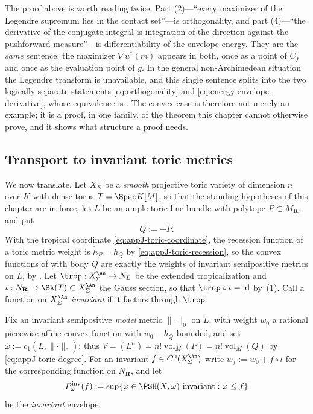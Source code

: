 \begin{remark}
\label{rem:ch27-one-computation}
The proof above is worth reading twice.  Part (2)---``every maximizer of the
Legendre supremum lies in the contact set''---is orthogonality, and part
(4)---``the derivative of the conjugate integral is integration of the
direction against the pushforward measure''---is differentiability of the
envelope energy.  They are the \emph{same} sentence: the maximizer
$\nabla u^*(m)$ appears in both, once as a point of $C_f$ and once as the
evaluation point of $g$.  In the general non-Archimedean situation the
Legendre transform is unavailable, and this single sentence splits into the
two logically separate statements \eqref{eq:orthogonality} and
\eqref{eq:energy-envelope-derivative}, whose equivalence is
.  The convex case is
therefore not merely an example; it is a proof, in one family, of the
theorem this chapter cannot otherwise prove, and it shows what structure a
proof needs.
\end{remark}

\subsection{Transport to invariant toric metrics}
\label{sec:ch27-toric-transport}

We now translate.  Let $X_\Sigma$ be a \emph{smooth} projective toric
variety of dimension $n$ over $K$ with dense torus $T=\Spec K[M]$, so
that the standing hypotheses of this chapter are in force, let $L$ be an
ample toric line bundle with polytope $P\subset M_{\mathbf R}$, and put
\[
 Q:=-P .
\]
With the tropical coordinate \eqref{eq:appJ-toric-coordinate}, the recession
function of a toric metric weight is
$\check h_P=h_Q$ by \eqref{eq:appJ-toric-recession}, so the convex
functions of  with body $Q$ are
exactly the weights of invariant semipositive metrics on $L$, by
.  Let $\trop:X_\Sigma^{\An}\to
N_\Sigma$ be the extended tropicalization and
$\iota:N_{\mathbf R}\to\Sk(T)\subset X_\Sigma^{\An}$ the Gauss section, so
that $\trop\circ\iota=\operatorname{id}$ by
\,(1).  Call a function on $X_\Sigma^{\An}$
\emph{invariant} if it factors through $\trop$.

Fix an invariant semipositive \emph{model} metric $\lVert\cdot\rVert_0$ on
$L$, with weight $w_0$ a rational piecewise affine convex function with
$w_0-h_Q$ bounded, and set $\omega:=c_1(L,\lVert\cdot\rVert_0)$; thus
$V=(L^n)=n!\operatorname{vol}_M(P)=n!\operatorname{vol}_M(Q)$ by
\eqref{eq:appJ-toric-degree}.  For an invariant $f\in C^0(X_\Sigma^{\An})$
write $w_f:=w_0+f\circ\iota$ for the corresponding function on
$N_{\mathbf R}$, and let
\begin{equation}\label{eq:ch27-invariant-envelope}
 P^{\mathrm{inv}}_\omega(f):=
 \sup\{\varphi\in\PSH(X,\omega)\ \text{invariant}:\varphi\leq f\}
\end{equation}
be the \emph{invariant} envelope.

